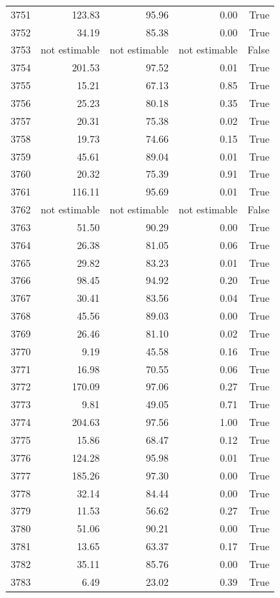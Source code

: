 \begin{longtable}{rrrrr}
3751 & 123.83 & 95.96 & 0.00 & True \\
3752 & 34.19 & 85.38 & 0.00 & True \\
3753 & not estimable & not estimable & not estimable & False \\
3754 & 201.53 & 97.52 & 0.01 & True \\
3755 & 15.21 & 67.13 & 0.85 & True \\
3756 & 25.23 & 80.18 & 0.35 & True \\
3757 & 20.31 & 75.38 & 0.02 & True \\
3758 & 19.73 & 74.66 & 0.15 & True \\
3759 & 45.61 & 89.04 & 0.01 & True \\
3760 & 20.32 & 75.39 & 0.91 & True \\
3761 & 116.11 & 95.69 & 0.01 & True \\
3762 & not estimable & not estimable & not estimable & False \\
3763 & 51.50 & 90.29 & 0.00 & True \\
3764 & 26.38 & 81.05 & 0.06 & True \\
3765 & 29.82 & 83.23 & 0.01 & True \\
3766 & 98.45 & 94.92 & 0.20 & True \\
3767 & 30.41 & 83.56 & 0.04 & True \\
3768 & 45.56 & 89.03 & 0.00 & True \\
3769 & 26.46 & 81.10 & 0.02 & True \\
3770 & 9.19 & 45.58 & 0.16 & True \\
3771 & 16.98 & 70.55 & 0.06 & True \\
3772 & 170.09 & 97.06 & 0.27 & True \\
3773 & 9.81 & 49.05 & 0.71 & True \\
3774 & 204.63 & 97.56 & 1.00 & True \\
3775 & 15.86 & 68.47 & 0.12 & True \\
3776 & 124.28 & 95.98 & 0.01 & True \\
3777 & 185.26 & 97.30 & 0.00 & True \\
3778 & 32.14 & 84.44 & 0.00 & True \\
3779 & 11.53 & 56.62 & 0.27 & True \\
3780 & 51.06 & 90.21 & 0.00 & True \\
3781 & 13.65 & 63.37 & 0.17 & True \\
3782 & 35.11 & 85.76 & 0.00 & True \\
3783 & 6.49 & 23.02 & 0.39 & True \\

\end{longtable}
